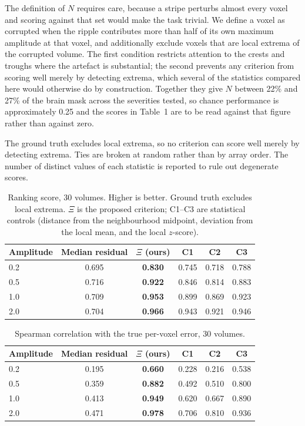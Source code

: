 \documentclass[12pt]{article}
\theoremstyle{definition}
\theoremstyle{plain}
\begin{document}
The definition of $N$ requires care, because a stripe perturbs almost every voxel and
scoring against that set would make the task trivial. We define a voxel as corrupted
when the ripple contributes more than half of its own maximum amplitude at that
voxel, and additionally exclude voxels that are local extrema of the corrupted
volume. The first condition restricts attention to the crests and troughs where the
artefact is substantial; the second prevents any criterion from scoring well merely
by detecting extrema, which several of the statistics compared here would otherwise
do by construction. Together they give $N$ between 22\% and 27\% of the brain mask
across the severities tested, so chance performance is approximately 0.25 and the
scores in Table~1 are to be read against that figure rather than against zero.

The ground truth excludes local extrema, so no criterion can score well merely by
detecting extrema. Ties are broken at random rather than by array order. The number
of distinct values of each statistic is reported to rule out degenerate scores.

\begin{table}[H]
\centering
\caption{Ranking score, 30 volumes. Higher is better. Ground truth excludes local
extrema. $\Xi$ is the proposed criterion; C1--C3 are statistical controls
(distance from the neighbourhood midpoint, deviation from the local mean, and the
local $z$-score).}
\begin{tabular}{lccccc}
\toprule
Amplitude & Median residual & $\Xi$ (ours) & C1 & C2 & C3 \\
\midrule
0.2 & 0.695 & \textbf{0.830} & 0.745 & 0.718 & 0.788 \\
0.5 & 0.716 & \textbf{0.922} & 0.846 & 0.814 & 0.883 \\
1.0 & 0.709 & \textbf{0.953} & 0.899 & 0.869 & 0.923 \\
2.0 & 0.704 & \textbf{0.966} & 0.943 & 0.921 & 0.946 \\
\bottomrule
\end{tabular}
\end{table}

\begin{table}[H]
\centering
\caption{Spearman correlation with the true per-voxel error, 30 volumes.}
\begin{tabular}{lccccc}
\toprule
Amplitude & Median residual & $\Xi$ (ours) & C1 & C2 & C3 \\
\midrule
0.2 & 0.195 & \textbf{0.660} & 0.228 & 0.216 & 0.538 \\
0.5 & 0.359 & \textbf{0.882} & 0.492 & 0.510 & 0.800 \\
1.0 & 0.413 & \textbf{0.949} & 0.620 & 0.667 & 0.890 \\
2.0 & 0.471 & \textbf{0.978} & 0.706 & 0.810 & 0.936 \\
\bottomrule
\end{tabular}
\end{table}
\end{document}
